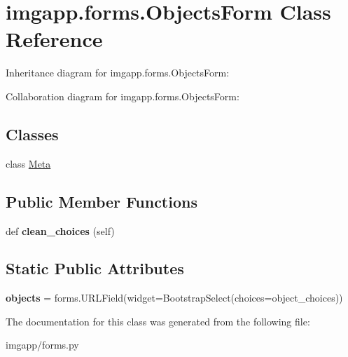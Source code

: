 \hypertarget{classimgapp_1_1forms_1_1ObjectsForm}{}\section{imgapp.\+forms.\+Objects\+Form Class Reference}
\label{classimgapp_1_1forms_1_1ObjectsForm}


Inheritance diagram for imgapp.\+forms.\+Objects\+Form\+:


Collaboration diagram for imgapp.\+forms.\+Objects\+Form\+:
\subsection*{Classes}
\begin{DoxyCompactItemize}
\item 
class \hyperlink{classimgapp_1_1forms_1_1ObjectsForm_1_1Meta}{Meta}
\end{DoxyCompactItemize}
\subsection*{Public Member Functions}
\begin{DoxyCompactItemize}
\item 
\mbox{\label{classimgapp_1_1forms_1_1ObjectsForm_a8d55097e5ed4e0eb4c2a9256e6cfaf88}} 
def {\bfseries clean\+\_\+choices} (self)
\end{DoxyCompactItemize}
\subsection*{Static Public Attributes}
\begin{DoxyCompactItemize}
\item 
\mbox{\label{classimgapp_1_1forms_1_1ObjectsForm_aeb7cfd73ebaf5cb231dacfbe5f5cc7b1}} 
{\bfseries objects} = forms.\+U\+R\+L\+Field(widget=Bootstrap\+Select(choices=object\+\_\+choices))
\end{DoxyCompactItemize}


The documentation for this class was generated from the following file\+:\begin{DoxyCompactItemize}
\item 
imgapp/forms.\+py\end{DoxyCompactItemize}
